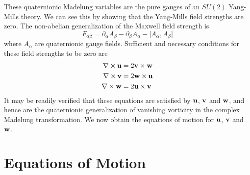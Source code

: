 \documentclass[a4paper,aps,prd,preprint,groupedaddress]{revtex4}
\newcommand{\bfu}{{\bf u}}
\newcommand{\bfv}{{\bf v}}
\newcommand{\bfw}{{\bf w}}
\begin{document}
These quaternionic Madelung variables are the pure gauges of an $SU(2)$ Yang-Mills theory. We can see this by showing that the Yang-Mills field strengths are zero. The non-abelian generalization of the Maxwell field strength is
\begin{equation}
F_{\alpha\beta} = \partial_\alpha A_\beta - \partial_\beta A_\alpha  -\bigl[A_\alpha,A_\beta\bigr]
\end{equation}
where $A_\alpha$ are quaternionic gauge fields. Sufficient and necessary conditions for these field strengths to be zero are
\begin{equation}
\label{eq:curls}
\begin{split}
\nabla \times \bfu &= 2 \bfv\times\bfw\\
\nabla \times \bfv &= 2 \bfw\times\bfu\\
\nabla \times \bfw &= 2\bfu\times\bfv\\
\end{split}
\end{equation}
It may be readily verified that these equations are satisfied by $\bfu$, $\bfv$ and $\bfw$, and hence are the quaternionic generalization of vanishing vorticity in the complex Madelung transformation. We now obtain the equations of motion for $\bfu$, $\bfv$ and $\bfw$.

\section{Equations of Motion}
\end{document}
